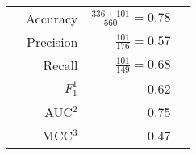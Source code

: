 \begin{tabular}{lrllll}
\rule{0pt}{12pt} & Accuracy & \multicolumn{3}{r}{$\frac{336 + 101}{560} = 0.78$} &  \tabularnewline
\rule{0pt}{12pt}& Precision & \multicolumn{3}{r}{$\frac{101}{176} = 0.57$} & \tabularnewline
\rule{0pt}{12pt}& Recall & \multicolumn{3}{r}{$\frac{101}{149} = 0.68$} &  \tabularnewline
\rule{0pt}{12pt}& $F_1^1$ & \multicolumn{3}{r}{0.62} & \tabularnewline
\rule{0pt}{12pt}& AUC$^2$ & \multicolumn{3}{r}{0.75} & \tabularnewline
\rule{0pt}{12pt}& MCC$^3$ & \multicolumn{3}{r}{0.47} & \tabularnewline
\end{tabular}
